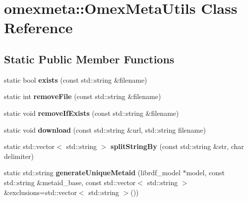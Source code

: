 \hypertarget{classomexmeta_1_1OmexMetaUtils}{}\section{omexmeta\+:\+:Omex\+Meta\+Utils Class Reference}
\label{classomexmeta_1_1OmexMetaUtils}
\subsection*{Static Public Member Functions}
\begin{DoxyCompactItemize}
\item 
\mbox{\label{classomexmeta_1_1OmexMetaUtils_ab72b362607e6bbdd0025eefa574cd073}} 
static bool {\bfseries exists} (const std\+::string \&filename)
\item 
\mbox{\label{classomexmeta_1_1OmexMetaUtils_a9c445a8e0cc6589b25d6fa630686c171}} 
static int {\bfseries remove\+File} (const std\+::string \&filename)
\item 
\mbox{\label{classomexmeta_1_1OmexMetaUtils_a8e629136cb2685ed839ea3a0e88094e6}} 
static void {\bfseries remove\+If\+Exists} (const std\+::string \&filename)
\item 
\mbox{\label{classomexmeta_1_1OmexMetaUtils_a046b603d6308242b70b55de6cb72325c}} 
static void {\bfseries download} (const std\+::string \&url, std\+::string filename)
\item 
\mbox{\label{classomexmeta_1_1OmexMetaUtils_aac769ce6e901f32820cd7dc3fef989fa}} 
static std\+::vector$<$ std\+::string $>$ {\bfseries split\+String\+By} (const std\+::string \&str, char delimiter)
\item 
\mbox{\label{classomexmeta_1_1OmexMetaUtils_af525c7529d2674365f8c43639f11dff9}} 
static std\+::string {\bfseries generate\+Unique\+Metaid} (librdf\+\_\+model $\ast$model, const std\+::string \&metaid\+\_\+base, const std\+::vector$<$ std\+::string $>$ \&exclusions=std\+::vector$<$ std\+::string $>$())
\item 
\mbox{\label{classomexmeta_1_1OmexMetaUtils_a6694715cf3f5dccd33d416ecc84ff375}} 

\end{DoxyCompactItemize}
